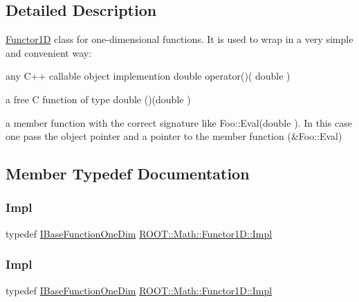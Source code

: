 \subsection{Detailed Description}
\mbox{\hyperlink{classROOT_1_1Math_1_1Functor1D}{Functor1D}} class for one-\/dimensional functions. It is used to wrap in a very simple and convenient way\+: 
\begin{DoxyItemize}
\item any C++ callable object implemention double operator()( double  ) 
\item a free C function of type double ()(double ) 
\item a member function with the correct signature like Foo\+::\+Eval(double ). In this case one pass the object pointer and a pointer to the member function (\&Foo\+::\+Eval) 
\end{DoxyItemize}

\subsection{Member Typedef Documentation}
\mbox{\label{classROOT_1_1Math_1_1Functor1D_ae7e0743edafd220a53b994cbbfbd7a9a}} 
\subsubsection{\texorpdfstring{Impl}{Impl}\hspace{0.1cm}{\footnotesize\ttfamily [1/3]}}
{\footnotesize\ttfamily typedef \mbox{\hyperlink{classROOT_1_1Math_1_1IBaseFunctionOneDim}{I\+Base\+Function\+One\+Dim}} \mbox{\hyperlink{classROOT_1_1Math_1_1Functor1D_ae7e0743edafd220a53b994cbbfbd7a9a}{R\+O\+O\+T\+::\+Math\+::\+Functor1\+D\+::\+Impl}}}

\mbox{\label{classROOT_1_1Math_1_1Functor1D_ae7e0743edafd220a53b994cbbfbd7a9a}} 
\subsubsection{\texorpdfstring{Impl}{Impl}\hspace{0.1cm}{\footnotesize\ttfamily [2/3]}}
{\footnotesize\ttfamily typedef \mbox{\hyperlink{classROOT_1_1Math_1_1IBaseFunctionOneDim}{I\+Base\+Function\+One\+Dim}} \mbox{\hyperlink{classROOT_1_1Math_1_1Functor1D_ae7e0743edafd220a53b994cbbfbd7a9a}{R\+O\+O\+T\+::\+Math\+::\+Functor1\+D\+::\+Impl}}}

